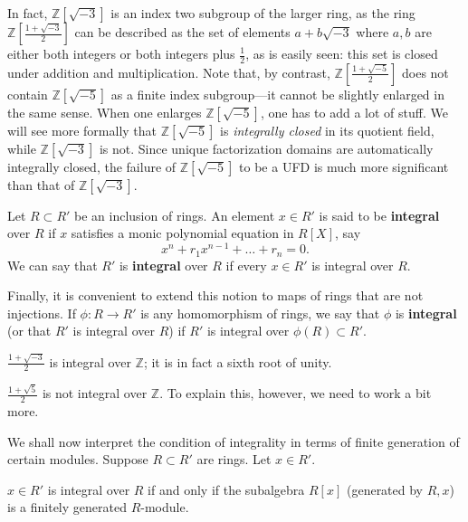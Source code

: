 In fact, $\mathbb{Z}[\sqrt{-3}]$ is an index two subgroup of the larger ring, as the ring $\mathbb{Z}[ \frac{1 + \sqrt{-3}}{2}]$
can be described as the set of elements $a +
b\sqrt{-3}$ where $a,b$ are either both integers or both integers plus
$\frac{1}{2}$, as is easily seen: this set is closed under addition and
multiplication.
Note that, by contrast, $\mathbb{Z}[ \frac{1 + \sqrt{-5}}{2}]$ does not
contain $\mathbb{Z}[\sqrt{-5}]$ as a finite index subgroup---it cannot be
slightly enlarged in the same sense. When one enlarges $\mathbb{Z}[\sqrt{-5}]$,
one has to add a lot of stuff.
We will see more formally that $\mathbb{Z}[\sqrt{-5}]$ is \emph{integrally
closed} in its quotient field, while $\mathbb{Z}[\sqrt{-3}]$ is not. Since
unique factorization domains are automatically integrally closed, the failure
of $\mathbb{Z}[\sqrt{-5}]$ to be a UFD is much more significant than that of
$\mathbb{Z}[\sqrt{-3}]$.

\begin{definition} \label{intdefn}
Let $R \subset R'$ be an inclusion of rings.  An element $x \in R'$
is said to be \textbf{integral} over $R$ if $x$ satisfies a monic polynomial
equation in $R[X]$, say
\[ x^n + r_1 x^{n-1} + \dots + r_n = 0.  \]
We can say that $R'$ is \textbf{integral} over $R$ if every $x \in R'$ is
integral over $R$.

Finally, it is convenient to extend this notion to maps of rings that are not
injections. If $\phi: R \to R'$ is any homomorphism of rings, we say that
$\phi$ is \textbf{integral} (or that $R'$ is integral over $R$) if $R'$ is
integral over $\phi(R) \subset R'$.
\end{definition}

\begin{example}
$\frac{1+\sqrt{-3}}{2}$ is integral over $\mathbb{Z}$; it is in fact a sixth
root of unity.
\end{example}

\begin{example}
$\frac{1+\sqrt{5}}{2}$ is not integral over $\mathbb{Z}$. To explain this,
however, we
need to work a bit more.
\end{example}

We shall now interpret the condition of integrality in terms of finite
generation of certain modules.
Suppose $R \subset R'$ are rings.  Let $x \in R'$.

\begin{proposition}  \label{onegeneratorintegral}
$x \in R'$ is integral over $R$ if and only if the subalgebra $R[x]$
(generated by $R, x$) is a finitely generated
$R$-module.
\end{proposition}

